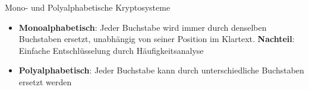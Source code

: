 \begin{frame}{Mono- und Polyalphabetische Kryptosysteme}
	\begin{itemize}[<+->]
		\item \textbf{Monoalphabetisch}: Jeder Buchstabe wird immer durch denselben Buchstaben ersetzt, unabhängig von seiner Position im Klartext. \textbf{Nachteil}: Einfache Entschlüsselung durch Häufigkeitsanalyse
		\item \textbf{Polyalphabetisch}: Jeder Buchstabe kann durch unterschiedliche Buchstaben ersetzt werden
	\end{itemize}
\end{frame}


